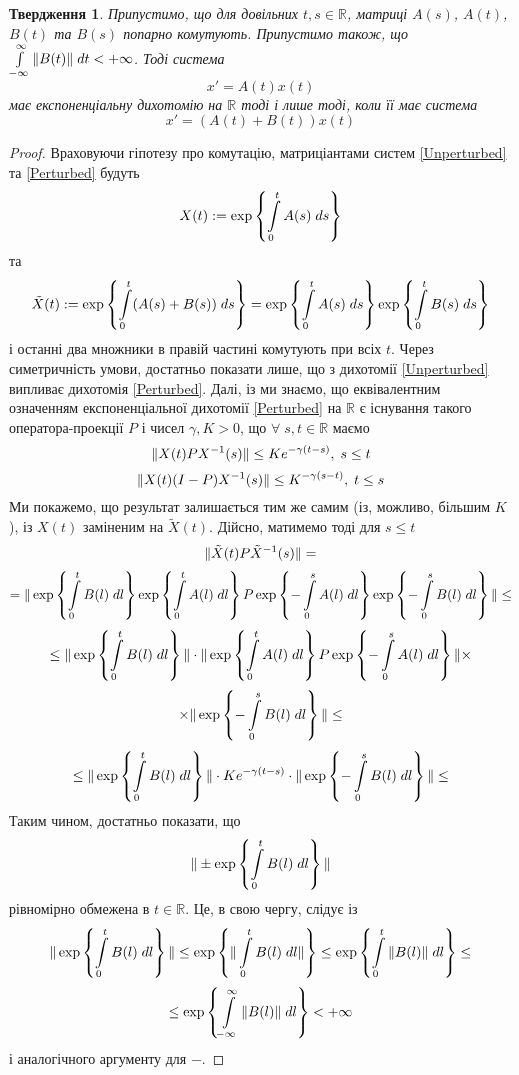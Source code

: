 \documentclass[14pt]{extarticle} %
\title{}
\author{Олексій Леонтьєв}
\let\oldforall\forall
\renewcommand{\forall}{\oldforall\;}
\newtheorem{proposition}{Твердження}
\theoremstyle{remark}
\begin{document}
\maketitle
\begin{proposition}Припустимо, що для довільних $t,s\in\mathbb{R}$, матриці $A(s)$, $A(t)$, $B(t)$ та $B(s)$ попарно комутують.
	Припустимо також, що $\int_{-\infty}^\infty\mynorm{B(t)}\;dt<+\infty$. Тоді система 
	\begin{equation}\label{Unperturbed}
	x'=A(t)x(t)
	\end{equation}
	має експоненціальну дихотомію на $\mathbb{R}$ тоді і лише тоді, коли її має система
	\begin{equation}\label{Perturbed}
	x'=(A(t)+B(t))x(t)
	\end{equation}
\end{proposition}
\begin{proof}Враховуючи гіпотезу про комутацію, матриціантами систем \eqref{Unperturbed} та \eqref{Perturbed} будуть
	\[X(t):=\exp\mycbra{\int_0^tA(s)\;ds}\]
	та \[\tilde{X}(t):=\exp\mycbra{\int_0^t(A(s)+B(s))\;ds}=\exp\mycbra{\int_0^tA(s)\;ds}\exp\mycbra{\int_0^tB(s)\;ds}\]
	і останні два множники в правій частині комутують при всіх $t$.
	Через симетричність умови, достатньо показати лише, що з дихотомії \eqref{Unperturbed} випливає дихотомія \eqref{Perturbed}.
	Далі, із \cite{coppel} ми знаємо, що еквівалентним означенням експоненціальної дихотомії \eqref{Perturbed}
	на $\mathbb{R}$ є існування
	такого оператора-проекції $P$ і чисел $\gamma,K>0$, що $\forall s,t\in\mathbb{R}$ маємо
	\[\|X(t)PX^{-1}(s)\|\leq Ke^{-\gamma(t-s)},\;s\leq t\]
	\[\|X(t)(I-P)X^{-1}(s)\|\leq K^{-\gamma(s-t)},\;t\leq s\]
	Ми покажемо, що результат залишається тим же самим (із, можливо, більшим $K$), із $X(t)$ заміненим на $\tilde{X}(t)$.
	Дійсно, матимемо тоді для $s\leq t$
	\[\|\tilde{X}(t)P\tilde{X}^{-1}(s)\|=\]
	\[=\mynorm{\exp\mycbra{\int_0^tB(l)\;dl}\exp\mycbra{\int_0^tA(l)\;dl}P\exp\mycbra{-\int_0^sA(l)\;dl}
	\exp\mycbra{-\int_0^sB(l)\;dl}}\leq\]
	\[\leq\mynorm{\exp\mycbra{\int_0^tB(l)\;dl}}\cdot\mynorm{\exp\mycbra{\int_0^tA(l)\;dl}P\exp\mycbra{-\int_0^sA(l)\;dl}}\times
	\]\[\times\mynorm{\exp\mycbra{-\int_0^sB(l)\;dl}}\leq\]
	\[\leq\mynorm{\exp\mycbra{\int_0^tB(l)\;dl}}\cdot Ke^{-\gamma(t-s)}\cdot
	\mynorm{\exp\mycbra{-\int_0^sB(l)\;dl}}\leq\]
	Таким чином, достатньо показати, що
	\[\mynorm{\pm\exp\mycbra{\int_0^tB(l)\;dl}}\]
	рівномірно обмежена в $t\in\mathbb{R}$. Це, в свою чергу, слідує із
	\[\mynorm{\exp\mycbra{\int_0^tB(l)\;dl}}\leq\exp\mycbra{\mynorm{\int_0^tB(l)\;dl}}\leq\exp\mycbra{\int_0^t\mynorm{B(l)}\;dl
	}\leq\]
	\[\leq\exp\mycbra{\int_{-\infty}^{\infty}\mynorm{B(l)}\;dl}<+\infty\]
	і аналогічного аргументу для $-$.
\end{proof}
\end{document}
